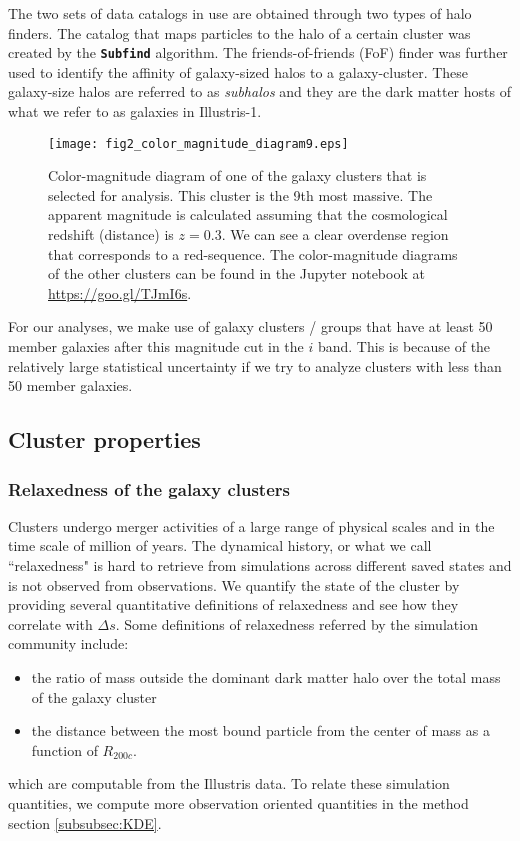 The two sets of data catalogs in use are obtained through two types of halo
finders. The catalog that maps particles to the halo of a certain cluster was 
created by the {\bf \texttt{Subfind}} algorithm. The friends-of-friends (FoF) 
finder \citep{Davis1985} was further used to identify the affinity
of galaxy-sized halos to a galaxy-cluster. 
These galaxy-size halos are referred to as {\it subhalos} and 
they are the dark matter hosts of what we refer to as galaxies in Illustris-1. 

\begin{figure}
	\centering
	\texttt{[image: fig2\_color\_magnitude\_diagram9.eps]}
	\caption{Color-magnitude diagram of one of the galaxy clusters that is selected for 
		analysis. This cluster is the 9th most massive. 
		The apparent magnitude is calculated assuming that 
		the cosmological redshift (distance) is $z = 0.3$. 
		We can see a clear overdense region that corresponds to a red-sequence.
		The color-magnitude diagrams of the other clusters can be found in the
		Jupyter notebook at \href{https://github.com/karenyyng/galaxy_DM_offset/blob/master/code/analyses/fig2_color_magnitude_diagram.ipynb}{https://goo.gl/TJmI6s}.
		\label{fig:color_magnitude_diagram}
	} 
\end{figure}
For our analyses, we make use of galaxy clusters / groups 
that have at least 50 member galaxies after this magnitude cut in the $i$ band. 
This is because of the relatively large statistical uncertainty if we try
to analyze clusters with less than 50 member galaxies. 




\subsection{Cluster properties}
\label{subsubsec:cluster_properties}

\subsubsection{Relaxedness of the galaxy clusters}

Clusters undergo merger activities of a large range of physical scales and 
in the time scale of million of years. 
The dynamical history, or what we call ``relaxedness" is hard to retrieve from 
simulations across different saved states and is not observed from observations.
We quantify the state of the cluster by providing several quantitative
definitions of relaxedness and see how they correlate with $\Delta s$.
Some definitions of relaxedness referred by the simulation community
include:
\begin{itemize}
	\item the ratio of mass outside the dominant dark matter halo over the total mass
		of the galaxy cluster 
	\item the distance between the most bound particle from the center of mass as a
		function of $R_{200c}$.
\end{itemize}
which are computable from the Illustris data. 
To relate these simulation quantities, we compute more observation oriented 
quantities in the method section \ref{subsubsec:KDE}. 


